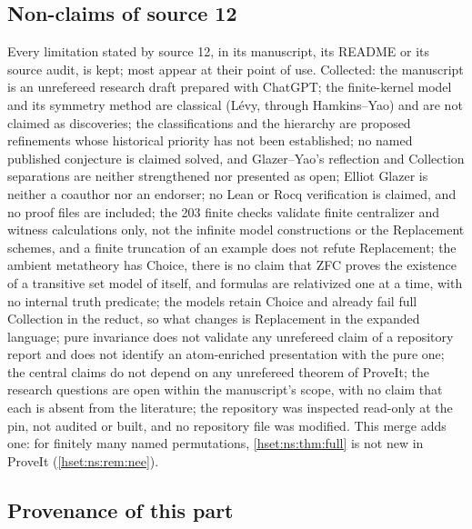 \documentclass[11pt,letterpaper]{article}
\theoremstyle{definition}
\theoremstyle{remark}
\begin{document}
\subsection{Non-claims of source 12}
\label{hset:ns:sub:nonclaims}
Every limitation stated by source 12, in its manuscript, its README or its
source audit, is kept; most appear at their point of use. Collected: the
manuscript is an unrefereed research draft prepared with ChatGPT; the
finite-kernel model and its symmetry method are classical (L\'evy, through
Hamkins--Yao) and are not claimed as discoveries; the classifications and the
hierarchy are proposed refinements whose historical priority has not been
established; no named published conjecture is claimed solved, and Glazer--Yao's
reflection and Collection separations are neither strengthened nor presented as
open; Elliot Glazer is neither a coauthor nor an endorser; no Lean or Rocq
verification is claimed, and no proof files are included; the 203 finite checks
validate finite centralizer and witness calculations only, not the infinite
model constructions or the Replacement schemes, and a finite truncation of an
example does not refute Replacement; the ambient metatheory has Choice, there is
no claim that ZFC proves the existence of a transitive set model of itself, and
formulas are relativized one at a time, with no internal truth predicate; the
models retain Choice and already fail full Collection in the reduct, so what
changes is Replacement in the expanded language; pure invariance does not
validate any unrefereed claim of a repository report and does not identify an
atom-enriched presentation with the pure one; the central claims do not depend
on any unrefereed theorem of ProveIt; the research questions are open within the
manuscript's scope, with no claim that each is absent from the literature; the
repository was inspected read-only at the pin, not audited or built, and no
repository file was modified. This merge adds one: for finitely many named
permutations, \cref{hset:ns:thm:full} is not new in ProveIt
(\cref{hset:ns:rem:nee}).

\subsection{Provenance of this part}
\label{hset:ns:sub:provenance}
\end{document}
